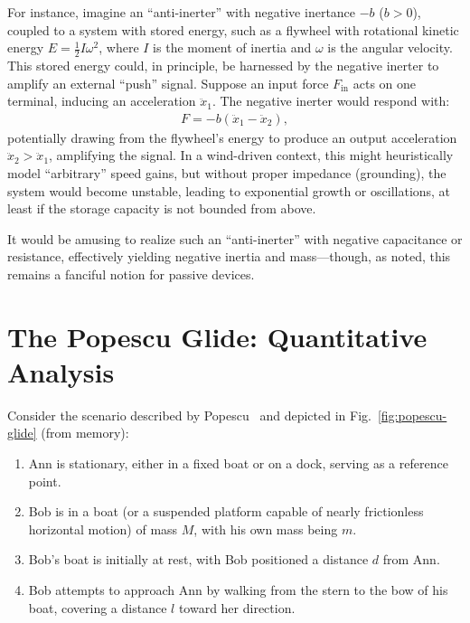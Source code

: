\documentclass[reprint,aps,pra,superscriptaddress,longbibliography]{revtex4-2}
\begin{document}
For instance, imagine an ``anti-inerter'' with negative inertance $-b$ ($b > 0$), coupled to a system with stored energy, such as a flywheel with rotational kinetic energy $E = \frac{1}{2} I \omega^2$, where $I$ is the moment of inertia and $\omega$ is the angular velocity. This stored energy could, in principle, be harnessed by the negative inerter to amplify an external ``push'' signal. Suppose an input force $F_{\text{in}}$ acts on one terminal, inducing an acceleration $\ddot{x}_1$. The negative inerter would respond with:
\begin{align}
    F = -b (\ddot{x}_1 - \ddot{x}_2),
\end{align}
potentially drawing from the flywheel's energy to produce an output acceleration $\ddot{x}_2 > \ddot{x}_1$, amplifying the signal. In a wind-driven context, this might heuristically model ``arbitrary'' speed gains, but without proper impedance (grounding), the system would become unstable, leading to exponential growth or oscillations, at least if the storage capacity is not bounded from above.

It would be amusing to realize such an ``anti-inerter'' with negative capacitance or resistance, effectively yielding negative inertia and mass---though, as noted, this remains a fanciful notion for passive devices.

\section{The Popescu Glide: Quantitative Analysis}

Consider the scenario described by Popescu~\cite{popescu_talk_2024} and depicted in Fig.~\ref{fig:popescu-glide} (from memory):

\begin{enumerate}
    \item Ann is stationary, either in a fixed boat or on a dock, serving as a reference point.
    \item Bob is in a boat (or a suspended platform capable of nearly frictionless horizontal motion) of mass $M$, with his own mass being $m$.
    \item Bob's boat is initially at rest, with Bob positioned a distance $d$ from Ann.
    \item Bob attempts to approach Ann by walking from the stern to the bow of his boat, covering a distance $l$ toward her direction.
\end{enumerate}
\end{document}
